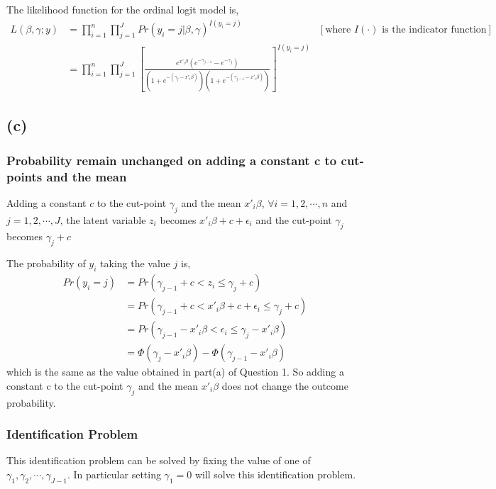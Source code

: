 \documentclass[a4paper]{article}
\begin{document}
The likelihood function for the ordinal logit model is,
\begin{align*}
    L(\beta,\gamma;y) &= \prod_{i=1}^{n}\prod_{j=1}^{J} Pr(y_i = j | \beta, \gamma)^{I(y_i = j)} &[\text{where } I(\cdot) \text{ is the indicator function}]\\
                      &=\prod_{i=1}^{n}\prod_{j=1}^{J} [\frac{e^{x'_i\beta}(e^{-\gamma_{j-1}} - e^{-\gamma_{j}})}{(1+e^{-(\gamma_j - x'_{i}\beta)})(1+e^{-(\gamma_{j-1} - x'_{i}\beta)})}]^{I(y_i = j)} 
\end{align*}

\subsection*{(c)}

\subsubsection*{Probability remain unchanged on adding a constant c to cut-points and the mean}

Adding a constant $c$ to the cut-point $\gamma_j$ and the mean $x'_i\beta$, $\forall i = 1,2, \cdots, n$ and $j = 1,2,\cdots, J$, the latent variable $z_i$ becomes $x'_i\beta + c + \epsilon_i$ and the cut-point $\gamma_j$ becomes $\gamma_j + c$

The probability of $y_i$ taking the value $j$ is,
\begin{align*}
    Pr(y_i = j) &= Pr(\gamma_{j-1}+c < z_i \leq \gamma_j + c)\\
                &= Pr(\gamma_{j-1}+c < x'_i\beta + c + \epsilon_i \leq \gamma_j + c)\\
                &= Pr(\gamma_{j-1} - x'_i\beta  < \epsilon_i \leq \gamma_j - x'_i\beta ) \\
                &= \Phi(\gamma_j - x'_i\beta) - \Phi(\gamma_{j-1} - x'_i\beta)
\end{align*}
which is the same as the value obtained in part(a) of Question 1. So adding a constant c to the cut-point $\gamma_j$ and the mean $x'_i\beta$ does not change the outcome probability.

\subsubsection*{Identification Problem}
This identification problem can be solved by fixing the value of one of $\gamma_1, \gamma_2, \cdots, \gamma_{J-1}$. In particular setting $\gamma_1 = 0$ will solve this identification problem.
\end{document}
